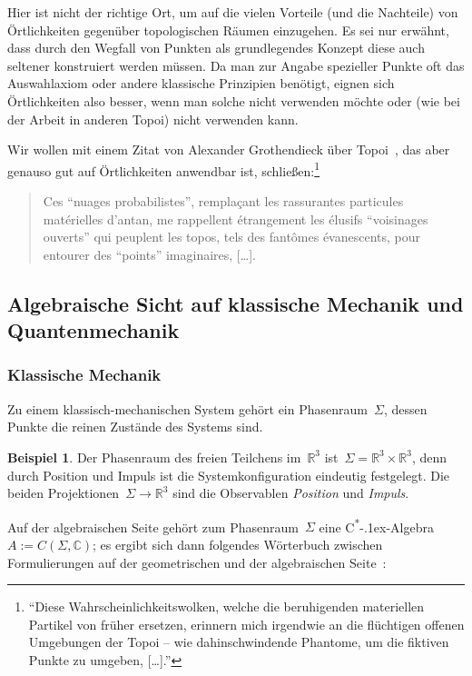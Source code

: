 \documentclass[a4paper,ngerman,12pt]{scrartcl}
\theoremstyle{definition}
\newtheorem{bsp}[defn]{Beispiel}
\theoremstyle{plain}
\theoremstyle{remark}
\newcommand{\RR}{\mathbb{R}}
\newcommand{\CC}{\mathbb{C}}
\newcommand{\csalgebra}{C\textsuperscript{*}\kern-.1ex-Algebra}
\renewcommand{\_}{\mathpunct{.}\,}
\newcommand{\?}{\,{:}\,}
\begin{document}
Hier ist nicht der richtige Ort, um auf die vielen Vorteile (und die Nachteile) von
Örtlichkeiten gegenüber topologischen Räumen einzugehen. Es sei nur erwähnt,
dass durch den Wegfall von Punkten als grundlegendes Konzept diese auch
seltener konstruiert werden müssen. Da man zur Angabe spezieller Punkte oft das
Auswahlaxiom oder andere klassische Prinzipien benötigt, eignen sich
Örtlichkeiten also besser, wenn man solche nicht verwenden möchte oder (wie bei
der Arbeit in anderen Topoi) nicht verwenden kann.

Wir wollen mit einem Zitat von Alexander Grothendieck über
Topoi~\cite{grothendieck:zitat}, das aber
genauso gut auf Örtlichkeiten anwendbar ist, schließen:\footnote{%
"`Diese \glq Wahrscheinlichkeitswolken\grq, welche die beruhigenden materiellen
Partikel von früher ersetzen, erinnern mich irgendwie an die flüchtigen
\glq offenen Umgebungen\grq{} der Topoi -- wie dahinschwindende Phantome, um
die fiktiven \glq Punkte\grq{} zu umgeben, [\ldots]."'}
\begin{quote}
Ces “nuages probabilistes”, remplaçant les rassurantes particules matérielles
d’antan, me rappellent étrangement les élusifs “voisinages ouverts” qui
peuplent les topos, tels des fantômes évanescents, pour entourer des “points”
imaginaires, [\ldots].
\end{quote}


\subsection{Algebraische Sicht auf klassische Mechanik und Quantenmechanik}

\subsubsection*{Klassische Mechanik}

Zu einem klassisch-mechanischen System gehört ein Phasenraum~$\Sigma$, dessen
Punkte die reinen Zustände des Systems sind.

\begin{bsp}Der Phasenraum des freien Teilchens im~$\RR^3$ ist~$\Sigma = \RR^3
\times \RR^3$, denn durch Position und Impuls ist die Systemkonfiguration
eindeutig festgelegt. Die beiden Projektionen~$\Sigma \to \RR^3$ sind die
Observablen \emph{Position} und \emph{Impuls}.\end{bsp}

Auf der algebraischen Seite gehört zum Phasenraum~$\Sigma$ eine \csalgebra~$A
:= C(\Sigma, \CC)$; es ergibt sich dann folgendes Wörterbuch zwischen
Formulierungen auf der geometrischen und der algebraischen
Seite~\cite{nlab:classmech}:
\end{document}
